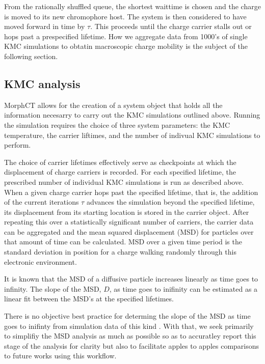 From the rationally shuffled queue, the shortest waittime is chosen and the charge is moved to
its new chromophore host. The system is then considered to have moved forward in time by $\tau$. This proceeds
until the charge carrier stalls out or hops past a prespecified lifetime. How we aggregate data from 1000's of
single KMC simulations to obtatin macroscopic charge mobility is the subject of the following section.



\subsection{KMC analysis}

MorphCT allows for the creation of a system object that holds all the information necesarry to carry out the
KMC simulations outlined above. Running the simulation requires the choice of three system parameters: the
KMC temperature, the carrier liftimes, and the number of indivual KMC simulations to perform.

The choice of carrier lifetimes effectively serve as checkpoints at which the displacement of charge carriers is recorded. For
each specified lifetime, the prescribed number of individual KMC simulations is run as described above. When a
given charge carrier hops past the specified lifetime, that is, the addition of the current iterations $\tau$ advances
the simulation beyond the specified lifetime, 
its displacement from its starting location is stored in the carrier object. After repeating this over a
statistically significant number of carriers, the carrier data can be aggregated and the mean squared
displacement (MSD) for particles over that amount of time can be calculated. MSD over a given time period is 
the standard deviation in position for a charge walking randomly through this electronic environment. 

It is known that the MSD of a diffusive particle increases linearly as time goes to infinity. 
The slope of the MSD, $D$, as time
goes to inifinity can be estimated as a linear fit between the MSD's at the specified lifetimes.

There is no objective best practice for determing the slope of the MSD as
time goes to inifinty from simulation data of this kind \cite{Maginn2018}. With that, we seek primarily to simplifiy the MSD analysis as much as
possible so as to accuratley report this stage of the analysis for clarity but also to facilitate apples to
apples comparisons to future works using this workflow. 

